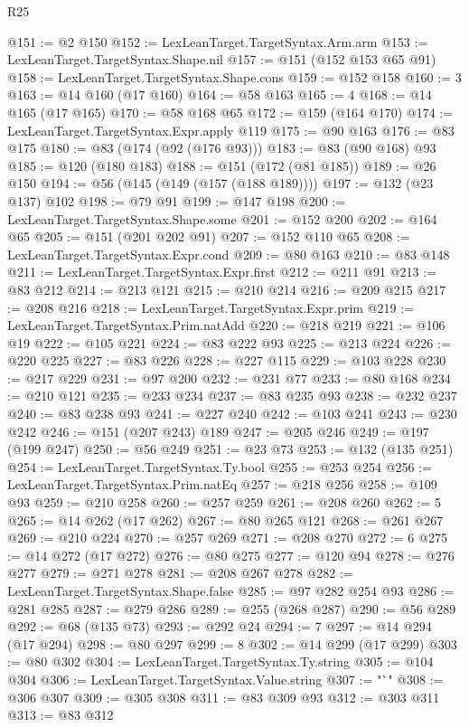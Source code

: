 \begin{lexlean}{R25}
\begin{coremodule}
@151 := @2 @150
@152 := LexLeanTarget.TargetSyntax.Arm.arm
@153 := LexLeanTarget.TargetSyntax.Shape.nil
@157 := @151 (@152 @153 @65 @91)
@158 := LexLeanTarget.TargetSyntax.Shape.cons
@159 := @152 @158
@160 := 3
@163 := @14 @160 (@17 @160)
@164 := @58 @163
@165 := 4
@168 := @14 @165 (@17 @165)
@170 := @58 @168 @65
@172 := @159 (@164 @170)
@174 := LexLeanTarget.TargetSyntax.Expr.apply @119
@175 := @90 @163
@176 := @83 @175
@180 := @83 (@174 (@92 (@176 @93)))
@183 := @83 (@90 @168) @93
@185 := @120 (@180 @183)
@188 := @151 (@172 (@81 @185))
@189 := @26 @150
@194 := @56 (@145 (@149 (@157 (@188 @189))))
@197 := @132 (@23 @137) @102
@198 := @79 @91
@199 := @147 @198
@200 := LexLeanTarget.TargetSyntax.Shape.some
@201 := @152 @200
@202 := @164 @65
@205 := @151 (@201 @202 @91)
@207 := @152 @110 @65
@208 := LexLeanTarget.TargetSyntax.Expr.cond
@209 := @80 @163
@210 := @83 @148
@211 := LexLeanTarget.TargetSyntax.Expr.first
@212 := @211 @91
@213 := @83 @212
@214 := @213 @121
@215 := @210 @214
@216 := @209 @215
@217 := @208 @216
@218 := LexLeanTarget.TargetSyntax.Expr.prim
@219 := LexLeanTarget.TargetSyntax.Prim.natAdd
@220 := @218 @219
@221 := @106 @19
@222 := @105 @221
@224 := @83 @222 @93
@225 := @213 @224
@226 := @220 @225
@227 := @83 @226
@228 := @227 @115
@229 := @103 @228
@230 := @217 @229
@231 := @97 @200
@232 := @231 @77
@233 := @80 @168
@234 := @210 @121
@235 := @233 @234
@237 := @83 @235 @93
@238 := @232 @237
@240 := @83 @238 @93
@241 := @227 @240
@242 := @103 @241
@243 := @230 @242
@246 := @151 (@207 @243) @189
@247 := @205 @246
@249 := @197 (@199 @247)
@250 := @56 @249
@251 := @23 @73
@253 := @132 (@135 @251)
@254 := LexLeanTarget.TargetSyntax.Ty.bool
@255 := @253 @254
@256 := LexLeanTarget.TargetSyntax.Prim.natEq
@257 := @218 @256
@258 := @109 @93
@259 := @210 @258
@260 := @257 @259
@261 := @208 @260
@262 := 5
@265 := @14 @262 (@17 @262)
@267 := @80 @265 @121
@268 := @261 @267
@269 := @210 @224
@270 := @257 @269
@271 := @208 @270
@272 := 6
@275 := @14 @272 (@17 @272)
@276 := @80 @275
@277 := @120 @94
@278 := @276 @277
@279 := @271 @278
@281 := @208 @267 @278
@282 := LexLeanTarget.TargetSyntax.Shape.false
@285 := @97 @282 @254 @93
@286 := @281 @285
@287 := @279 @286
@289 := @255 (@268 @287)
@290 := @56 @289
@292 := @68 (@135 @73)
@293 := @292 @24
@294 := 7
@297 := @14 @294 (@17 @294)
@298 := @80 @297
@299 := 8
@302 := @14 @299 (@17 @299)
@303 := @80 @302
@304 := LexLeanTarget.TargetSyntax.Ty.string
@305 := @104 @304
@306 := LexLeanTarget.TargetSyntax.Value.string
@307 := "`"
@308 := @306 @307
@309 := @305 @308
@311 := @83 @309 @93
@312 := @303 @311
@313 := @83 @312

\end{coremodule}
\end{lexlean}
